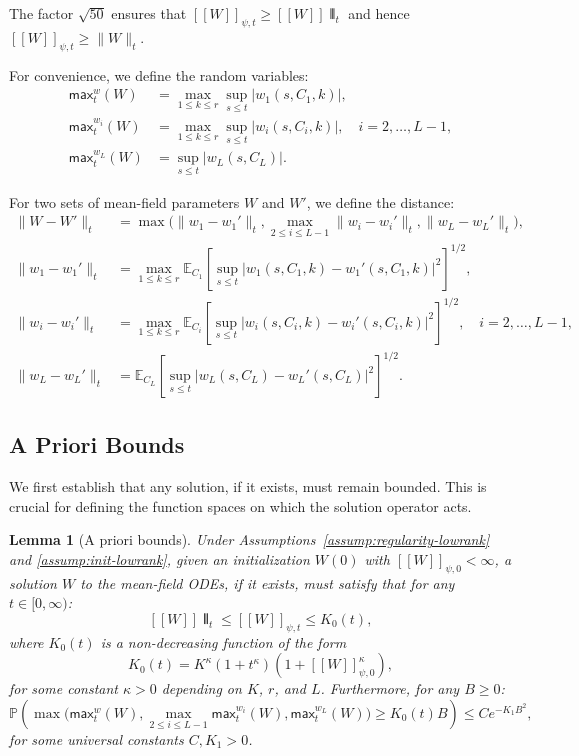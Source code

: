 \documentclass[11pt]{article}
\newcommand{\E}{\mathbb{E}}
\newcommand{\Pp}{\mathbb{P}}
\newcommand{\1}{\mathbbm{1}}
\newcommand{\llbracket}{[\![}
\newcommand{\rrbracket}{]\!]}
\newcommand{\interleave}[1]{\llbracket #1 \rrbracket}
\newtheorem{lemma}{Lemma}
\begin{document}
The factor $\sqrt{50}$ ensures that $\llbracket W\rrbracket_{\psi,t}\ge \interleave W\interleave_t$ and hence $\llbracket W\rrbracket_{\psi,t}\ge \|W\|_t$.

For convenience, we define the random variables:
\begin{align}
\mathsf{max}_t^w(W) &= \max_{1\le k\le r}\sup_{s\le t}|w_1(s,C_1,k)|,\\
\mathsf{max}_t^{w_i}(W) &= \max_{1\le k\le r}\sup_{s\le t}|w_i(s,C_i,k)|, \quad i=2,\ldots,L-1,\\
\mathsf{max}_t^{w_L}(W) &= \sup_{s\le t}|w_L(s,C_L)|.
\end{align}

For two sets of mean-field parameters $W$ and $W'$, we define the distance:
\begin{align}
\|W-W'\|_t &= \max\big(\|w_1-w_1'\|_t, \max_{2\le i\le L-1}\|w_i-w_i'\|_t, \|w_L-w_L'\|_t\big),\label{eq:distance-norm}\\
\|w_1-w_1'\|_t &= \max_{1\le k\le r}\E_{C_1}\!\left[\sup_{s\le t}|w_1(s,C_1,k)-w_1'(s,C_1,k)|^2\right]^{1/2},\nonumber\\
\|w_i-w_i'\|_t &= \max_{1\le k\le r}\E_{C_i}\!\left[\sup_{s\le t}|w_i(s,C_i,k)-w_i'(s,C_i,k)|^2\right]^{1/2}, \quad i=2,\ldots,L-1,\nonumber\\
\|w_L-w_L'\|_t &= \E_{C_L}\!\left[\sup_{s\le t}|w_L(s,C_L)-w_L'(s,C_L)|^2\right]^{1/2}.\nonumber
\end{align}

\subsection{A Priori Bounds}

We first establish that any solution, if it exists, must remain bounded. This is crucial for defining the function spaces on which the solution operator acts.

\begin{lemma}[A priori bounds]
\label{lem:a-priori-bounds}
Under Assumptions~\ref{assump:regularity-lowrank} and \ref{assump:init-lowrank}, given an initialization $W(0)$ with $\llbracket W\rrbracket_{\psi,0}<\infty$, a solution $W$ to the mean-field ODEs, if it exists, must satisfy that for any $t\in[0,\infty)$:
\[
\interleave W\interleave_t \le \llbracket W\rrbracket_{\psi,t} \le K_0(t),
\]
where $K_0(t)$ is a non-decreasing function of the form
\[
K_0(t) = K^{\kappa}(1+t^{\kappa})(1+\llbracket W\rrbracket_{\psi,0}^{\kappa}),
\]
for some constant $\kappa>0$ depending on $K$, $r$, and $L$. Furthermore, for any $B\ge 0$:
\[
\Pp\!\left(\max\big(\mathsf{max}_t^w(W), \max_{2\le i\le L-1}\mathsf{max}_t^{w_i}(W), \mathsf{max}_t^{w_L}(W)\big)\ge K_0(t)B\right) \le C e^{-K_1 B^2},
\]
for some universal constants $C, K_1>0$.
\end{lemma}
\end{document}
